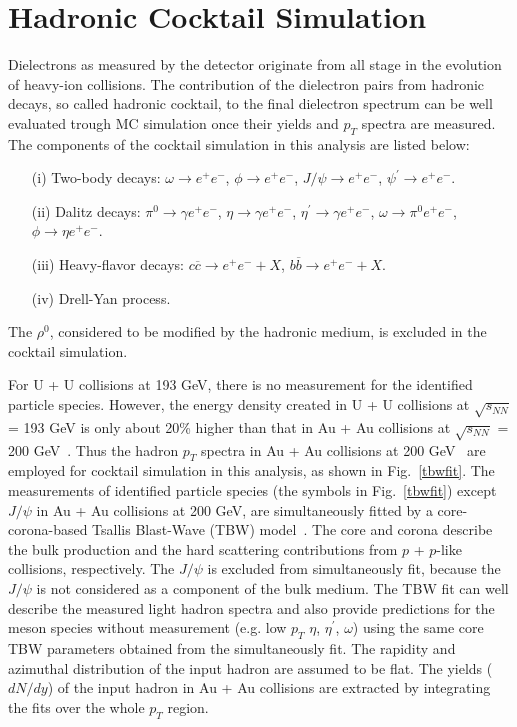 \section{Hadronic Cocktail Simulation}
\label{cocktail}
Dielectrons as measured by the detector originate from all stage in the evolution of heavy-ion collisions. The contribution of the dielectron pairs from hadronic decays, so called hadronic cocktail, to the final dielectron spectrum can be well evaluated trough MC simulation once their yields and $p_{T}$ spectra are measured. The components of the cocktail simulation in this analysis are listed below:
\begin{itemize}
\item[(i)] Two-body decays: $\omega \rightarrow e^{+}e^{-}$, $\phi \rightarrow e^{+}e^{-}$, $J/\psi \rightarrow e^{+}e^{-}$, $\psi^{\prime} \rightarrow e^{+}e^{-}$.
\item[(ii)] Dalitz decays: $\pi^{0} \rightarrow \gamma e^{+}e^{-}$, $\eta \rightarrow \gamma e^{+}e^{-}$, $\eta^{\prime} \rightarrow \gamma e^{+}e^{-}$, $\omega \rightarrow \pi^{0}e^{+}e^{-}$, $\phi \rightarrow \eta e^{+}e^{-}$.
\item[(iii)] Heavy-flavor decays: $c\overline{c} \rightarrow e^{+}e^{-}+X$, $b\overline{b} \rightarrow e^{+}e^{-}+X$.
\item[(iv)] Drell-Yan process.
\end{itemize}
The $\rho^{0}$, considered to be modified by the hadronic medium, is excluded in the cocktail simulation. 

For U + U collisions at 193 GeV, there is no measurement for the identified particle species. However, the energy density created in U + U collisions at $\sqrt{s_{NN}}$ = 193 GeV is only about 20\% higher than that in Au + Au collisions at $\sqrt{s_{NN}}$ = 200 GeV~\cite{UUEnergyDensity}. Thus the hadron $p_{T}$ spectra in Au + Au collisions at 200 GeV~\cite{STAR:dielectron1} are employed for cocktail simulation in this analysis, as shown in Fig.~\ref{tbwfit}. The measurements of identified particle species (the symbols in Fig.~\ref{tbwfit}) except $J/\psi$ in Au + Au collisions at 200 GeV, are simultaneously fitted by a core-corona-based Tsallis Blast-Wave (TBW) model~\cite{TBW0, TBW1}. The core and corona describe the bulk production and the hard scattering contributions from $p$ + $p$-like collisions, respectively. The $J/\psi$ is excluded from simultaneously fit, because the $J/\psi$ is not considered as a component of the bulk medium. The TBW fit can well describe the measured light hadron spectra and also provide predictions for the meson species without measurement (e.g. low $p_{T}$ $\eta$, $\eta^{\prime}$, $\omega$) using the same core TBW parameters obtained from the simultaneously fit. The rapidity and azimuthal distribution of the input hadron are assumed to be flat. The yields ($dN/dy$) of the input hadron in Au + Au collisions are extracted  by integrating the fits over the whole $p_{T}$ region.

